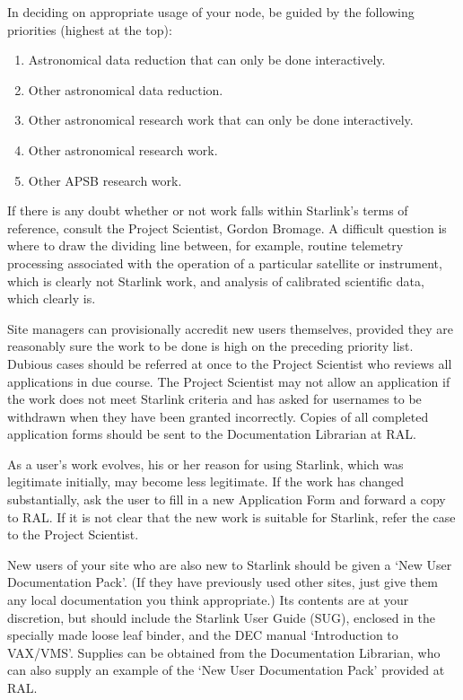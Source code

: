 In deciding on appropriate usage of your node, be guided by the following
priorities (highest at the top):
\begin{enumerate}
\item Astronomical data reduction that can only be done interactively.
\item Other astronomical data reduction.
\item Other astronomical research work that can only be done interactively.
\item Other astronomical research work.
\item Other APSB research work.
\end{enumerate}
If there is any doubt whether or not work falls within Starlink's terms of
reference, consult the Project Scientist, Gordon Bromage.
A difficult question is where to draw the dividing line between, for example,
routine telemetry processing associated with the operation of a particular
satellite or instrument, which is clearly not Starlink work, and analysis of
calibrated scientific data, which clearly is.

Site managers can provisionally accredit new users themselves, provided they 
are reasonably sure the work to be done is high on the preceding priority list.
Dubious cases should be referred at once to the Project Scientist who reviews
all applications in due course.
The Project Scientist may not allow an application if the work does not meet
Starlink criteria and has asked for usernames to be withdrawn when they have
been granted incorrectly.
Copies of all completed application forms should be sent to the Documentation
Librarian at RAL.

As a user's work evolves, his or her reason for using Starlink, which was
legitimate initially, may become less legitimate.
If the work has changed substantially, ask the user to fill in a new
Application Form and forward a copy to RAL.
If it is not clear that the new work is suitable for Starlink, refer the case
to the Project Scientist.
 
New users of your site who are also new to Starlink should be given a `New User
Documentation Pack'.
(If they have previously used other sites, just give them any local
documentation you think appropriate.)
Its contents are at your discretion, but should include the Starlink User Guide
(SUG), enclosed in the specially made loose leaf binder, and the DEC
manual `Introduction to VAX/VMS'.
Supplies can be obtained from the Documentation Librarian, who can also supply
an example of the `New User Documentation Pack' provided at RAL.

